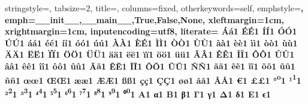 {	stringstyle=\color{stringColor},              %
	tabsize=2,                                    %
	title=\lstname,                               %
	columns=fixed,                                %
	otherkeywords={self},                         %
	emphstyle=\color{customColor}\bfseries,       %
	emph={__init__,__main__,True,False,None},     %
	xleftmargin=1cm,                              %
	xrightmargin=1cm,                             %
	inputencoding=utf8,
	literate={%
	            {Á}{{\'a}}1 {É}{{\'E}}1 {Í}{{\'I}}1 {Ó}{{\'O}}1 {Ú}{{\'U}}1%
	            {á}{{\'a}}1 {é}{{\'e}}1 {í}{{\'i}}1 {ó}{{\'o}}1 {ú}{{\'u}}1%
	            {À}{{\`A}}1 {È}{{\'E}}1 {Ì}{{\`I}}1 {Ò}{{\`O}}1 {Ù}{{\`U}}1%
	            {à}{{\`a}}1 {è}{{\`e}}1 {ì}{{\`i}}1 {ò}{{\`o}}1 {ù}{{\`u}}1%
	            {Ä}{{\"A}}1 {Ë}{{\"E}}1 {Ï}{{\"I}}1 {Ö}{{\"O}}1 {Ü}{{\"U}}1%
	            {ä}{{\"a}}1 {ë}{{\"e}}1 {ï}{{\"i}}1 {ö}{{\"o}}1 {ü}{{\"u}}1%
	            {Â}{{\^A}}1 {Ê}{{\^E}}1 {Î}{{\^I}}1 {Ô}{{\^O}}1 {Û}{{\^U}}1%
	            {â}{{\^a}}1 {ê}{{\^e}}1 {î}{{\^i}}1 {ô}{{\^o}}1 {û}{{\^u}}1%
	            {Ã}{{\~a}}1 {Ẽ}{{\~E}}1 {Ĩ}{{\~I}}1 {Õ}{{\~O}}1 {Ũ}{{\~U}}1 {Ñ}{{\~N}}1%
	            {ã}{{\~a}}1 {ẽ}{{\~e}}1 {ĩ}{{\~i}}1 {õ}{{\~o}}1 {ũ}{{\~u}}1 {ñ}{{\~n}}1%
	            {œ}{{\oe}}1 {Œ}{{\OE}}1 {æ}{{\ae}}1 {Æ}{{\AE}}1 {ß}{{\ss}}1%
	            {ç}{{\c c}}1 {Ç}{{\c C}}1 {ø}{{\o}}1 {å}{{\r a}}1 {Å}{{\r A}}1%
	            {€}{{\EUR}}1 {£}{{\pounds}}1%
	            {°}{{\textsuperscript{o}}}1%
	            {¹}{{\textsuperscript{1}}}1%
	            {²}{{\textsuperscript{2}}}1%
	            {³}{{\textsuperscript{3}}}1%
	            {⁴}{{\textsuperscript{4}}}1%
	            {⁵}{{\textsuperscript{5}}}1%
	            {⁶}{{\textsuperscript{6}}}1%
	            {⁷}{{\textsuperscript{7}}}1%
	            {⁸}{{\textsuperscript{8}}}1%
	            {⁹}{{\textsuperscript{9}}}1%
	            {⁰}{{\textsuperscript{0}}}1%
	            {A}{{\textAlpha}}1   {α}{{\textalpha}}1%
	            {B}{{\textBeta}}1    {β}{{\textbeta}}1%
	            {Γ}{{\textGamma}}1   {γ}{{\textgamma}}1%
	            {Δ}{{\textDelta}}1   {δ}{{\textdelta}}1%
	            {E}{{\textEpsilon}}1 {ϵ}{{\textepsilon}}1%
}}
